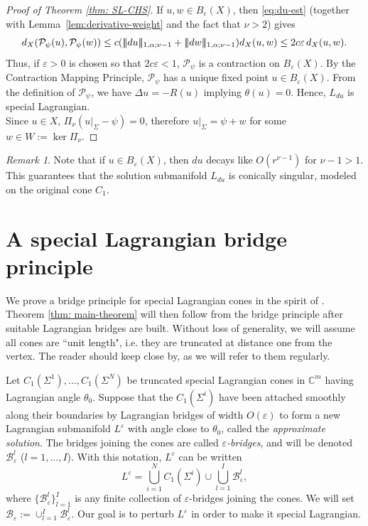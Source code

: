 \documentclass[11pt]{amsart}
\DeclarePairedDelimiter{\tnorm}{\vert\!\vert\!\vert}{\vert\!\vert\!\vert}
\theoremstyle{definition}
\theoremstyle{remark}
\newtheorem{remark}{Remark}
\newcommand{\C}{\mathbb{C}}
\begin{document}
\begin{proof}[Proof of Theorem \ref{thm: SL-CHS}]
If $u,w\in B_\varepsilon(X)$, then \eqref{eq:du-est} (together with  Lemma~\ref{lem:derivative-weight} and the fact that $\nu > 2$) gives
\[d_X(\mathcal  P_\psi(u), \mathcal P_\psi(w))
\le c(\tnorm{du}_{1,\alpha;\nu-1}+\tnorm{dw}_{1,\alpha;\nu-1})d_X(u,w)
\le 2c\varepsilon\,d_X(u,w).
\]
Thus, if $\varepsilon>0$ is chosen so that $2c\varepsilon<1$, $\mathcal{P}_\psi$ is a contraction on $B_\varepsilon(X)$. By the Contraction Mapping Principle, $\mathcal P_\psi$ has a unique fixed point $u\in B_\varepsilon(X)$. From the definition of $\mathcal{P}_\psi$, we have $\Delta u=-R(u)$ implying $\theta(u)=0$. Hence, $L_{du}$ is special Lagrangian.\\
Since $u\in X$, $\Pi_\nu(u\vert_\Sigma-\psi)=0$, therefore $u\vert_\Sigma=\psi+w$ for some $w\in W:=\ker \Pi_\nu$.
\end{proof}
\begin{remark}
Note that if $u \in B_\varepsilon(X)$, then $du$ decays like $O(r^{\nu-1})$ for $\nu - 1 > 1$. This guarantees that the solution submanifold $L_{du}$ is conically singular, modeled on the original cone $C_1$. 
\end{remark}


\section{A special Lagrangian bridge principle}
We prove a bridge principle for special Lagrangian cones in the spirit of \cite[Theorem 4.1]{Sm93}. Theorem \ref{thm: main-theorem} will then follow from the bridge principle after suitable Lagrangian bridges are built. Without loss of generality, we will assume all cones are ``unit length", i.e. they are truncated at distance one from the vertex. The reader should keep \cite{Sm87, Sm89, Sm93, Dim25} close by, as we will refer to them regularly.

Let $C_1(\Sigma^1), \ldots, C_1(\Sigma^N)$ be truncated special Lagrangian cones in $\C^m$ having Lagrangian angle $\theta_0$. Suppose that the $C_1(\Sigma^i)$ have been attached smoothly along their boundaries by Lagrangian bridges of width $O(\varepsilon)$ to form a new Lagrangian submanifold $L^\varepsilon$ with angle close to $\theta_0$, called the \emph{approximate solution}. The bridges joining the cones are called \emph{$\varepsilon$-bridges}, and will be denoted $\mathscr{B}_{\varepsilon}^l$ ($l = 1,\ldots, I$). With this notation, $L^\varepsilon$ can be written 
\[L^\varepsilon =\bigcup_{i=1}^N C_1(\Sigma^i) \cup \bigcup_{l = 1}^I \mathscr{B}_{\varepsilon}^l,\]
where $\{\mathscr{B}_{\varepsilon}^l\}_{l = 1}^I$ is any finite collection of $\varepsilon$-bridges joining the cones. We will set $\mathscr{B}_\varepsilon := \cup_{l=1}^I \mathscr{B}_{\varepsilon}^l$. Our goal is to perturb $L^\varepsilon$ in order to make it special Lagrangian.
\end{document}
